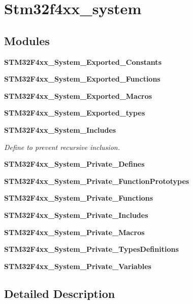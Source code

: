 \section{Stm32f4xx\+\_\+system}
\label{group__stm32f4xx__system}
\subsection*{Modules}
\begin{DoxyCompactItemize}
\item 
\textbf{ S\+T\+M32\+F4xx\+\_\+\+System\+\_\+\+Exported\+\_\+\+Constants}
\item 
\textbf{ S\+T\+M32\+F4xx\+\_\+\+System\+\_\+\+Exported\+\_\+\+Functions}
\item 
\textbf{ S\+T\+M32\+F4xx\+\_\+\+System\+\_\+\+Exported\+\_\+\+Macros}
\item 
\textbf{ S\+T\+M32\+F4xx\+\_\+\+System\+\_\+\+Exported\+\_\+types}
\item 
\textbf{ S\+T\+M32\+F4xx\+\_\+\+System\+\_\+\+Includes}
\begin{DoxyCompactList}\small\item\em Define to prevent recursive inclusion. \end{DoxyCompactList}\item 
\textbf{ S\+T\+M32\+F4xx\+\_\+\+System\+\_\+\+Private\+\_\+\+Defines}
\item 
\textbf{ S\+T\+M32\+F4xx\+\_\+\+System\+\_\+\+Private\+\_\+\+Function\+Prototypes}
\item 
\textbf{ S\+T\+M32\+F4xx\+\_\+\+System\+\_\+\+Private\+\_\+\+Functions}
\item 
\textbf{ S\+T\+M32\+F4xx\+\_\+\+System\+\_\+\+Private\+\_\+\+Includes}
\item 
\textbf{ S\+T\+M32\+F4xx\+\_\+\+System\+\_\+\+Private\+\_\+\+Macros}
\item 
\textbf{ S\+T\+M32\+F4xx\+\_\+\+System\+\_\+\+Private\+\_\+\+Types\+Definitions}
\item 
\textbf{ S\+T\+M32\+F4xx\+\_\+\+System\+\_\+\+Private\+\_\+\+Variables}
\end{DoxyCompactItemize}


\subsection{Detailed Description}
